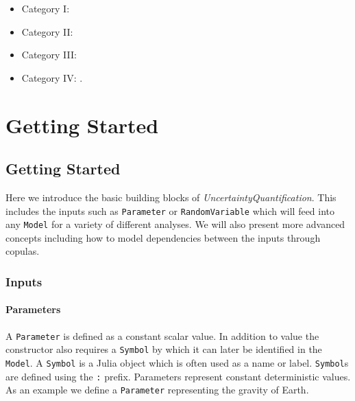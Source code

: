 \begin{itemize}
\item Category I: 


\item Category II: 


\item Category III: 


\item Category IV: .

\end{itemize}


\chapter{Getting Started}


\section{Getting Started}



\label{12615906682062737037}{}


Here we introduce the basic building blocks of \emph{UncertaintyQuantification}. This includes the inputs such as \texttt{Parameter} or \texttt{RandomVariable} which will feed into any \texttt{Model} for a variety of different analyses. We will also present more advanced concepts including how to model dependencies between the inputs through copulas.



\subsection{Inputs}



\label{509063468412031875}{}


\subsubsection{Parameters}



\label{12886555095302773432}{}


A \texttt{Parameter} is defined as a constant scalar value. In addition to value the constructor also requires a \texttt{Symbol} by which it can later be identified in the \texttt{Model}. A \texttt{Symbol} is a Julia object which is often used as a name or label. \texttt{Symbol}s are defined using the \texttt{:} prefix. Parameters represent constant deterministic values. As an example we define a \texttt{Parameter} representing the gravity of Earth.




